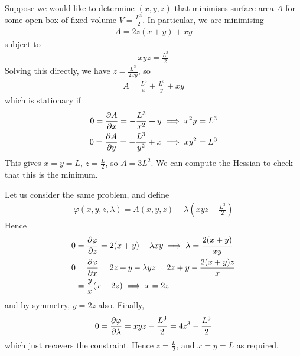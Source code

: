 \documentclass{../../template/note}
\begin{document}
    \begin{example*}
        Suppose we would like to determine $(x, y, z)$ that minimises surface area $A$ for some open box of fixed volume $V = \frac{L^3}{2}$. In particular, we are minimising
        \begin{align*}
            A = 2z(x+y) + xy
        \end{align*}
        subject to
        \begin{align*}
            xyz = \frac{L^3}{2}
        \end{align*}
        Solving this directly, we have $z = \frac{L^3}{2xy}$, so
        \begin{align*}
            A = \frac{L^3}{x} + \frac{L^3}{y} + xy
        \end{align*}
        which is stationary if
        \begin{align*}
            0 = \pd{A}{x} = -\frac{L^3}{x^2} + y \implies x^2y = L^3 \\
            0 = \pd{A}{y} = -\frac{L^3}{y^2} + x \implies xy^2 = L^3
        \end{align*}
        This gives $x=y=L$, $z = \frac L 2$, so $A = 3L^2$. We can compute the Hessian to check that this is the minimum.       
    \end{example*}
    
    \begin{example*}
        Let us consider the same problem, and define
        \begin{align*}
            \varphi(x,y,z,\lambda) = A(x,y,z) - \lambda\left(xyz-\frac{L^3}{2}\right)
        \end{align*}
        Hence
        \begin{align*}
            0 &= \pd{\varphi}{z} = 2(x+y)-\lambda xy \implies \lambda = \frac{2(x+y)}{xy} \\
            0 &= \pd{\varphi}{x} = 2z+y-\lambda yz = 2z + y - \frac{2(x+y)z}{x} \\
            &= \frac y x (x-2z) \implies x = 2z
        \end{align*}
        and by symmetry, $y=2z$ also. Finally,
        \begin{align*}
            0 = \pd{\varphi}{\lambda} = xyz-\frac{L^3}{2} = 4z^3 - \frac{L^3}{2}
        \end{align*}
        which just recovers the constraint. Hence $z = \frac L 2$, and $x=y=L$ as required.
    \end{example*}
    
\end{document}
